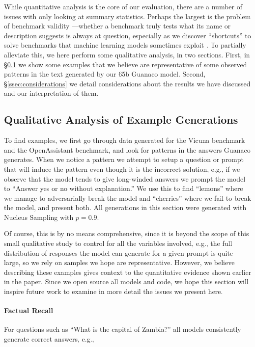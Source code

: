 While quantitative analysis is the core of our evaluation, there are a number of issues with only looking at summary statistics. Perhaps the largest is the problem of benchmark validity \citep{liao2021we}—whether a benchmark truly tests what its name or description suggests is always at question, especially as we discover ``shortcuts'' to solve benchmarks that machine learning models sometimes exploit \citep{gururangan2018annotation, poliak2018hypothesis}. To partially alleviate this, we here perform some qualitative analysis, in two sections. First, in \S\ref{ssec:examples} we show some examples that we believe are representative of some observed patterns in the text generated by our 65b {Guanaco} model. Second, \S\ref{ssec:considerations} we detail considerations about the results we have discussed and our interpretation of them.

\subsection{Qualitative Analysis of Example Generations}
\label{ssec:examples}

To find examples, we first go through data generated for the Vicuna benchmark and the OpenAssistant benchmark, and look for patterns in the answers {Guanaco} generates. When we notice a pattern we attempt to setup a question or prompt that will induce the pattern even though it is the incorrect solution, e.g., if we observe that the model tends to give long-winded answers we prompt the model to ``Answer yes or no without explanation.'' We use this to find ``lemons'' where we manage to adversarially break the model and ``cherries'' where we fail to break the model, and present both. All generations in this section were generated with Nucleus Sampling \cite{holtzmancurious} with $p=0.9$.

Of course, this is by no means comprehensive, since it is beyond the scope of this small qualitative study to control for all the variables involved, e.g., the full distribution of responses the model can generate for a given prompt is quite large, so we rely on samples we hope are representative. However, we believe describing these examples gives context to the quantitative evidence shown earlier in the paper. Since we open source all models and code, we hope this section will inspire future work to examine in more detail the issues we present here.
\paragraph{Factual Recall} For questions such as ``What is the capital of Zambia?'' all models consistently generate correct answers, e.g.,

